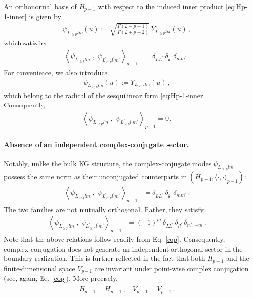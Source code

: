 \documentclass[aps,twocolumn,nofootinbib]{revtex4}
\begin{document}
An orthonormal basis of $H_{p-1}$ with respect to the induced inner product \eqref{eq:Hp-1-inner} is given by
\begin{align}\label{eq:5.78}
    \psi^{}_{L^{}_{\geqslant p}lm}(u) := \sqrt{\frac{\Gamma(L-p+1)}{\Gamma(L+p+2)}}\; Y_{L^{}_{\geqslant p}lm}(u) \,,
\end{align}
which satisfies  
\begin{align}
    \left\langle \psi^{}_{L^{}_{\geqslant p}lm} \;,\; \psi^{}_{L^{\prime}_{\geqslant p}l^\prime m^\prime} \right\rangle_{p-1} &= \delta_{LL^\prime} \,\delta_{ll^\prime} \,\delta_{mm^\prime} \label{orthonormality} \,.
\end{align}
For convenience, we also introduce
\begin{align} \label{gaugeBoundaryModes}
    \psi^{}_{L^{}_{<p}lm}(u) := Y_{L_{<p}lm}(u) \,,
\end{align}
which belong to the radical of the sesquilinear form
\eqref{eq:Hp-1-inner}. Consequently,
\begin{align}\label{orthonormality'}
    \left\langle \psi^{}_{L^{}_{\geqslant p}lm} \;,\; \psi^{}_{L^{\prime}_{< p}l^\prime m^\prime} \right\rangle_{p-1} = 0 \,.
\end{align}

\paragraph{Absence of an independent complex-conjugate sector.} Notably, unlike the bulk KG structure, the complex-conjugate modes $\overline{\psi^{}_{L^{}_{\geqslant p}lm}}$ possess the same norm as their unconjugated counterparts in $(H_{p-1},\langle\cdot,\cdot\rangle_{p-1})$:
\begin{align}\label{eq:bdry-norm}
    \left\langle\overline{\psi^{}_{L^{}_{\geqslant p}lm}} \;,\;  \overline{\psi_{L^\prime_{\geqslant p} l^\prime m^\prime}}\right\rangle_{p-1} &= \delta_{LL^\prime} \,\delta_{ll^\prime} \,\delta_{mm^\prime}\,.
\end{align}
The two families are not mutually orthogonal. Rather, they satisfy
\begin{align}\label{eq:bdry-cross}
    \left\langle\overline{\psi^{}_{L^{}_{\geqslant p}lm}} \;,\; \psi_{L^\prime_{\geqslant p} l^\prime m^\prime}\right\rangle_{p-1} &= (-1)^m \,\delta_{LL^\prime} \,\delta_{ll^\prime} \,\delta_{m^\prime,-m}\,.
\end{align}
Note that the above relations follow readily from Eq. \eqref{cop}. Consequently, complex conjugation does not generate an independent orthogonal sector in the boundary realization. This is further reflected in the fact that both $H_{p-1}$ and the finite-dimensional space $V_{p-1}$ are invariant under point-wise complex conjugation (see, again, Eq. \eqref{cop}). More precisely,
\begin{align}
    \overline{H_{p-1}} = H_{p-1}\,, \quad \overline{V_{p-1}} = V_{p-1} \,.
\end{align}
\end{document}
